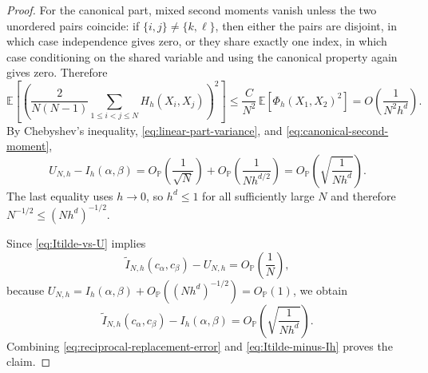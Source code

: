 \documentclass[a4paper,11pt, DIV=10]{scrartcl}
\numberwithin{equation}{section}
\theoremstyle{definition}
\theoremstyle{remark}
\begin{document}
\begin{proof}
For the canonical part, mixed second moments vanish unless the two unordered pairs coincide: if $\{i,j\}\neq \{k,\ell\}$, then either the pairs are disjoint, in which case independence gives zero, or they share exactly one index, in which case conditioning on the shared variable and using the canonical property again gives zero. Therefore
\begin{equation}
\label{eq:canonical-second-moment}
\mathbb E\!\left[
\left(
\frac{2}{N(N-1)}
\sum_{1\le i<j\le N} H_h(X_i,X_j)
\right)^2
\right]
\le
\frac{C}{N^2}\,\mathbb E[\Phi_h(X_1,X_2)^2]
=
O\!\left(\frac{1}{N^2h^d}\right).
\end{equation}
By Chebyshev's inequality, \eqref{eq:linear-part-variance}, and \eqref{eq:canonical-second-moment},
\begin{equation}
\label{eq:u-stat-rate}
U_{N,h}-I_h(\alpha,\beta)
=
O_{\mathbb P}\!\left(\frac{1}{\sqrt{N}}\right)
+
O_{\mathbb P}\!\left(\frac{1}{N h^{d/2}}\right)
=
O_{\mathbb P}\!\left(\sqrt{\frac{1}{N h^d}}\right).
\end{equation}
The last equality uses $h\to 0$, so $h^d\le 1$ for all sufficiently large $N$ and therefore $N^{-1/2}\le (Nh^d)^{-1/2}$.

Since \eqref{eq:Itilde-vs-U} implies
\begin{equation}
\widetilde I_{N,h}(c_\alpha,c_\beta)-U_{N,h}
=
O_{\mathbb P}\!\left(\frac{1}{N}\right),
\end{equation}
because $U_{N,h}=I_h(\alpha,\beta)+O_{\mathbb P}((Nh^d)^{-1/2})=O_{\mathbb P}(1)$, we obtain
\begin{equation}
\label{eq:Itilde-minus-Ih}
\widetilde I_{N,h}(c_\alpha,c_\beta)-I_h(\alpha,\beta)
=
O_{\mathbb P}\!\left(\sqrt{\frac{1}{N h^d}}\right).
\end{equation}
Combining \eqref{eq:reciprocal-replacement-error} and \eqref{eq:Itilde-minus-Ih} proves the claim.
\end{proof}
\end{document}
